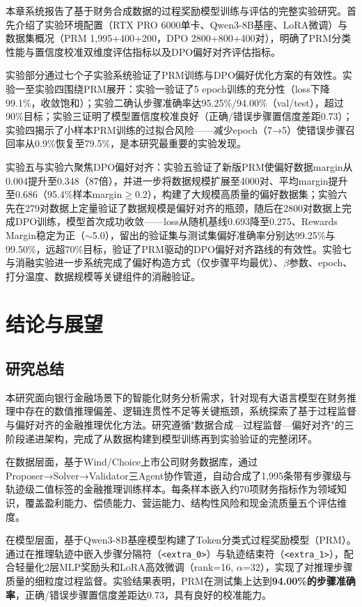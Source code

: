 \documentclass[professional,privacy,print,win,long,STEM,AutoFakeBold]{def/buaa}
\begin{document}
本章系统报告了基于财务合成数据的过程奖励模型训练与评估的完整实验研究。首先介绍了实验环境配置（RTX PRO 6000单卡、Qwen3-8B基座、LoRA微调）与数据集概况（PRM 1,995+400+200，DPO 2800+800+400对），明确了PRM分类性能与置信度校准双维度评估指标以及DPO偏好对齐评估指标。

实验部分通过七个子实验系统验证了PRM训练与DPO偏好优化方案的有效性。实验一至实验四围绕PRM展开：实验一验证了5 epoch训练的充分性（loss下降99.1\%，收敛饱和）；实验二确认步骤准确率达95.25\%/94.00\%（val/test），超过90\%目标；实验三证明了模型置信度校准良好（正确/错误步骤置信度差距0.73）；实验四揭示了小样本PRM训练的过拟合风险——减少epoch（7→5）使错误步骤召回率从0.9\%恢复至79.5\%，是本研究最重要的实验发现。

实验五与实验六聚焦DPO偏好对齐：实验五验证了新版PRM使偏好数据margin从0.004提升至0.348（87倍），并进一步将数据规模扩展至4000对、平均margin提升至0.686（95.4\%样本margin$\geq$0.2），构建了大规模高质量的偏好数据集；实验六先在279对数据上定量验证了数据规模是偏好对齐的瓶颈，随后在2800对数据上完成DPO训练，模型首次成功收敛——loss从随机基线0.693降至0.275、Rewards Margin稳定为正（$\sim$5.0），留出的验证集与测试集偏好准确率分别达99.25\%与99.50\%，远超70\%目标，验证了PRM驱动的DPO偏好对齐路线的有效性。实验七与消融实验进一步系统完成了偏好构造方式（仅步骤平均最优）、$\beta$参数、epoch、打分温度、数据规模等关键组件的消融验证。


\newpage
\chapter{结论与展望}
\section{研究总结}

本研究面向银行金融场景下的智能化财务分析需求，针对现有大语言模型在财务推理中存在的数值推理偏差、逻辑连贯性不足等关键瓶颈，系统探索了基于过程监督与偏好对齐的金融推理优化方法。研究遵循"数据合成—过程监督—偏好对齐"的三阶段递进架构，完成了从数据构建到模型训练再到实验验证的完整闭环。

在数据层面，基于Wind/Choice上市公司财务数据库，通过Proposer→Solver→Validator三Agent协作管道，自动合成了1,995条带有步骤级与轨迹级二值标签的金融推理训练样本。每条样本嵌入约70项财务指标作为领域知识，覆盖盈利能力、偿债能力、营运能力、结构性风险和现金流质量五个评估维度。

在模型层面，基于Qwen3-8B基座模型构建了Token分类式过程奖励模型（PRM）。通过在推理轨迹中嵌入步骤分隔符（\texttt{<extra\_0>}）与轨迹结束符（\texttt{<extra\_1>}），配合轻量化2层MLP奖励头和LoRA高效微调（rank=16, $\alpha$=32），实现了对推理步骤质量的细粒度过程监督。实验结果表明，PRM在测试集上达到\textbf{94.00\%的步骤准确率}，正确/错误步骤置信度差距达0.73，具有良好的校准能力。
\end{document}
